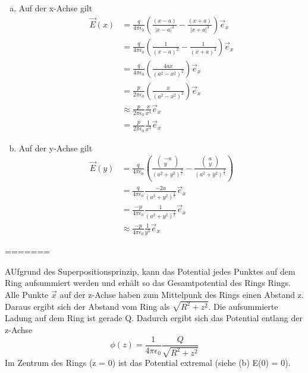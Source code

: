 \begin{enumerate}[(a)]
\item Auf der x-Achse gilt
\begin{align}
  \vec E(x) &= \frac{q}{4 \pi \epsilon_0}\left(\frac{(x-a)}{|x-a|^3}-\frac{(x+a)}{|x+a|^3}\right)\vec e_x\\
  &=\frac{q}{4 \pi \epsilon_0}\left(\frac{1}{(x-a)^2}-\frac{1}{(x+a)^2}\right)\vec e_x\\
  &=\frac{q}{4 \pi \epsilon_0}\left(\frac{4ax}{(a^2-x^2)^2}\right)\vec e_x\\
  &=\frac{p}{2 \pi \epsilon_0}\left(\frac{x}{(a^2-x^2)^2}\right)\vec e_x\\
  &\approx\frac{p}{2 \pi \epsilon_0}\frac{x}{x^4}\vec e_x\\
  &=\frac{p}{2 \pi \epsilon_0}\frac{1}{x^3}\vec e_x
\end{align}

\item Auf der y-Achse gilt
\begin{align}
\vec E(y) &= \frac{q}{4 \pi \epsilon_0}\left(\frac{\begin{pmatrix} -a\\y \end{pmatrix}}{(a^2+y^2)^{\frac{3}{2}}}-\frac{\begin{pmatrix} a\\y \end{pmatrix}}{(a^2+y^2)^{\frac{3}{2}}}\right)\\
 &= \frac{q}{4 \pi \epsilon_0}\frac{-2a}{(a^2+y^2)^{\frac{3}{2}}} \vec e_x\\
 &= \frac{-p}{4 \pi \epsilon_0}\frac{1}{(a^2+y^2)^{\frac{3}{2}}} \vec e_x\\
 &\approx \frac{-p}{4 \pi \epsilon_0}\frac{1}{y^3} \vec e_x
\end{align}

\end{enumerate}
=======
\item AUfgrund des Superpositionsprinzip, kann das Potential jedes Punktes auf dem Ring aufsummiert werden und erhält so das Gesamtpotential des Rings Rings. Alle Punkte $\vec{x} $ auf der z-Achse haben zum Mittelpunk des Rings einen Abstand z. Daraus ergibt sich der Abstand vom Ring als $\sqrt{R^2 + z^2}$. Die aufsummierte Ladung auf dem Ring ist gerade Q. Dadurch ergibt sich das Potential entlang der z-Achse
\begin{equation}
\phi(z) = \frac{1}{4\pi \epsilon_{0}} \frac{Q}{\sqrt{R^2 + z^2}}
\end{equation}
Im Zentrum des Rings (z = 0) ist das Potential extremal (siehe (b) E(0) = 0).
